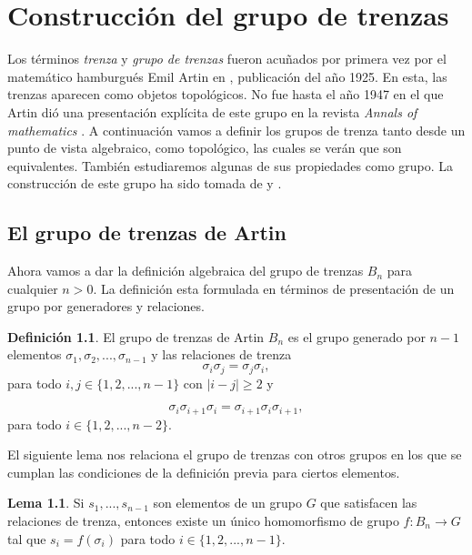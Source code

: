 \documentclass[12pt]{book}
\theoremstyle{definition}
\newtheorem{defi}{Definición}[section]
\newtheorem{lema}{Lema}[section]
\begin{document}
\chapter{Construcción del grupo de trenzas}
\label{sec:cons_grtr}
Los términos \textit{trenza} y \textit{grupo de trenzas} fueron acuñados por primera vez por el matemático hamburgués Emil Artin en \cite{Art1}, publicación del año 1925. En esta, las trenzas aparecen como objetos topológicos. No fue hasta el año 1947 en el que Artin dió una presentación explícita de este grupo en la revista \textit{Annals of mathematics} \cite{Art2}. A continuación vamos a definir los grupos de trenza tanto desde un punto de vista algebraico, como topológico, las cuales se verán que son equivalentes. También estudiaremos algunas de sus propiedades como grupo. La construcción de este grupo ha sido tomada de  \cite{br_gr} y \cite{st_br}.

\section{El grupo de trenzas de Artin}



Ahora vamos a dar la definición algebraica del grupo de trenzas $B_n$ para cualquier $n>0$. La definición esta formulada en términos de presentación de un grupo por generadores y relaciones.

\begin{defi}
El grupo de trenzas de Artin $B_n$ es el grupo generado por $n-1$ elementos $\sigma_1, \sigma_2,...,\sigma_{n-1}$ y las relaciones de trenza
$$\sigma_i\sigma_j = \sigma_j\sigma_i,$$
para todo $i,j\in\{1,2,...,n-1\}$ con $|i-j|\geq 2$ y

$$\sigma_i\sigma_{i+1}\sigma_i =\sigma_{i+1}\sigma_i\sigma_{i+1},$$
para todo $i\in\{1,2,...,n-2\}$.
\label{defi:artin}
\end{defi}

El siguiente lema nos relaciona el grupo de trenzas con otros grupos en los que se cumplan las condiciones de la definición previa para ciertos elementos.

\begin{lema}
Si $s_1,...,s_{n-1}$ son elementos de un grupo $G$ que satisfacen las relaciones de trenza, entonces existe un único homomorfismo de grupo $f:B_n\rightarrow G$ tal que $s_i = f(\sigma_i)$ para todo $i\in\{1,2,...,n-1\}$.
\label{uni_homo}
\end{lema}
\end{document}
